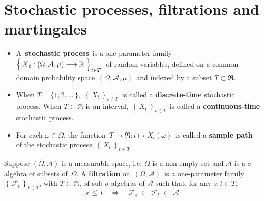 

\section{Stochastic processes, filtrations and martingales}
\setcounter{theorem}{0}
\setcounter{equation}{0}


\renewcommand{\theenumi}{\roman{enumi}}
\renewcommand{\labelenumi}{\textnormal{(\theenumi)}$\;\;$}


\begin{definition}
\mbox{}
\vskip -0.2cm
\noindent
\begin{itemize}
\item
	A \,\textbf{stochastic process}\, is a one-parameter family
	\,$\left\{\,\overset{{\color{white}.}}{X}_{t} : (\Omega,\mathcal{A},\mu) \longrightarrow \Re \;\right\}_{t \in T}$\,
	of random variables, defined on a common domain probability space
	\,$(\Omega,\mathcal{A},\mu)$\, and indexed by a subset $T \subset \Re$.
\item
	When $T = \{1,2,\ldots\,\}$,
	\,$\left\{\,X_{t}\,\right\}_{t \in T}$\,
	is called a \textbf{discrete-time} stochastic process.
	When $T \subset \Re$ is an interval,
	\,$\left\{\,X_{t}\,\right\}_{t \in T}$\,
	is called a \textbf{continuous-time} stochastic process.
\item
	For each $\omega \in \Omega$, the function
	\,$T \longrightarrow \Re : t \longmapsto X_{t}(\omega)$\,
	is called a \textbf{sample path} of the stochastic process
	\,$\left\{\,X_{t}\,\right\}_{t \in T}$.	
\end{itemize}
\end{definition}


\begin{definition}[Filtration]
\mbox{}
\vskip 0.2cm
\noindent
Suppose $(\Omega,\mathcal{A})$ is a measurable space,
i.e. $\Omega$ is a non-empty set and $\mathcal{A}$ is a $\sigma$-algebra
of subsets of \,$\Omega$.
A \textbf{filtration} on \,$(\Omega,\mathcal{A})$\,
is a one-parameter family
$\left\{\,\mathcal{F}_{t}\,\right\}_{t \in T}$, with $T \subset \Re$,
of sub-$\sigma$-algebras of $\mathcal{A}$
such that, for any $s, t \in T$,
\begin{equation*}
s \,\leq\, t
\quad\Longrightarrow\quad
\mathcal{F}_{s} \; \subset \; \mathcal{F}_{t} \; \subset \; \mathcal{A}
\end{equation*}
\end{definition}

